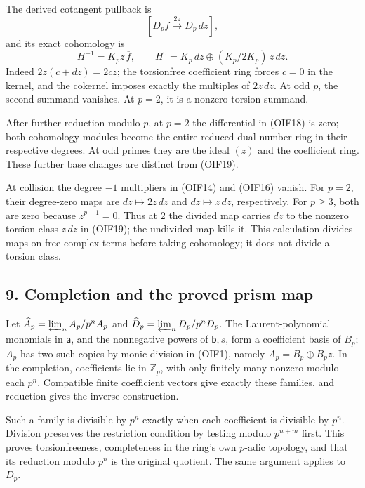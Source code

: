 \documentclass[
]{article}
\begin{document}
The derived cotangent pullback is \[
[D_p\overline f\xrightarrow{\,2z\,}D_p\,dz],
\tag{OIF18}
\] and its exact cohomology is \[
H^{-1}=K_pz\,\overline f,\qquad
H^0=K_p\,dz\oplus(K_p/2K_p)\,z\,dz.
\tag{OIF19}
\] Indeed \(2z(c+dz)=2cz\); the torsionfree coefficient ring forces
\(c=0\) in the kernel, and the cokernel imposes exactly the multiples of
\(2z\,dz\). At odd \(p\), the second summand vanishes. At \(p=2\), it is
a nonzero torsion summand.

After further reduction modulo \(p\), at \(p=2\) the differential in
(OIF18) is zero; both cohomology modules become the entire reduced
dual-number ring in their respective degrees. At odd primes they are the
ideal \((z)\) and the coefficient ring. These further base changes are
distinct from (OIF19).

At collision the degree \(-1\) multipliers in (OIF14) and (OIF16)
vanish. For \(p=2\), their degree-zero maps are \(dz\mapsto2z\,dz\) and
\(dz\mapsto z\,dz\), respectively. For \(p\ge3\), both are zero because
\(z^{p-1}=0\). Thus at 2 the divided map carries \(dz\) to the nonzero
torsion class \(z\,dz\) in (OIF19); the undivided map kills it. This
calculation divides maps on free complex terms before taking cohomology;
it does not divide a torsion class.

\subsection{9. Completion and the proved prism
map}\label{completion-and-the-proved-prism-map}

Let \(\widehat A_p=\varprojlim_nA_p/p^nA_p\) and
\(\widehat D_p=\varprojlim_nD_p/p^nD_p\). The Laurent-polynomial
monomials in \(\mathsf a\), and the nonnegative powers of
\(\mathsf b,s\), form a coefficient basis of \(B_p\); \(A_p\) has two
such copies by monic division in (OIF1), namely \(A_p=B_p\oplus B_pz\).
In the completion, coefficients lie in \(\mathbb Z_p\), with only
finitely many nonzero modulo each \(p^n\). Compatible finite coefficient
vectors give exactly these families, and reduction gives the inverse
construction.

Such a family is divisible by \(p^n\) exactly when each coefficient is
divisible by \(p^n\). Division preserves the restriction condition by
testing modulo \(p^{n+m}\) first. This proves torsionfreeness,
completeness in the ring's own \(p\)-adic topology, and that its
reduction modulo \(p^n\) is the original quotient. The same argument
applies to \(D_p\).
\end{document}
